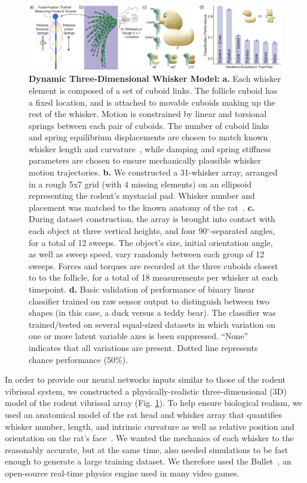 \begin{figure}
\FigCenter
\includegraphics [width=\DefaultFigSize\linewidth]{figures/whiskers.pdf}
\vspace{-3mm}
\caption{\footnotesize{\textbf{Dynamic Three-Dimensional Whisker Model:} \textbf{a.} Each whisker element is composed of a set of cuboid links. 
The follicle cuboid has a fixed location, and is attached to movable cuboids making up the rest of the whisker. 
Motion is constrained by linear and torsional springs between each pair of cuboids. 
The number of cuboid links and spring equilibrium displacements are chosen to match known whisker length and curvature~\cite{Towal2011}, while damping and spring stiffness parameters are chosen to ensure mechanically plausible whisker motion trajectories.  
\textbf{b.} We constructed a 31-whisker array, arranged in a rough 5x7 grid (with 4 missing elements) on an ellipsoid representing the rodent's mystacial pad.  Whisker number and placement was matched to the known anatomy of the rat~\cite{Towal2011}.
\textbf{c.} During dataset construction, the array is brought into contact with each object at three vertical heights, and four 90$^{\circ}$-separated angles, for a total of 12 sweeps.  
The object's size, initial orientation angle, as well as sweep speed, vary randomly between each group of 12 sweeps. 
Forces and torques are recorded at the three cuboids closest to to the follicle, for a total of 18 measurements per whisker at each timepoint. 
\textbf{d.} Basic validation of performance of binary linear classifier trained on raw sensor output to distinguish between two shapes (in this case, a duck versus a teddy bear).  The classifier was trained/tested on several equal-sized datasets in which variation on one or more latent variable axes is been suppressed. ``None'' indicates that all variations are present.  Dotted line represents chance performance (50\%).}~\label{fig_whiskers}}
\vspace{-6mm}
\end{figure}

In order to provide our neural networks inputs similar to those of the rodent vibrissal system, we constructed a physically-realistic three-dimensional (3D) model of the rodent vibrissal array (Fig. \ref{fig_whiskers}).  
To help ensure biological realism, we used an anatomical model of the rat head and whisker array that quantifies whisker number, length, and intrinsic curvature as well as relative position and orientation on the rat's face~\cite{Towal2011}.
We wanted the mechanics of each whisker to the reasonably accurate, but at the same time, also needed simulations to be fast enough to generate a large training dataset.   
We therefore used the Bullet~\cite{wiki:bullet}, an open-source real-time physics engine used in many video games. 

